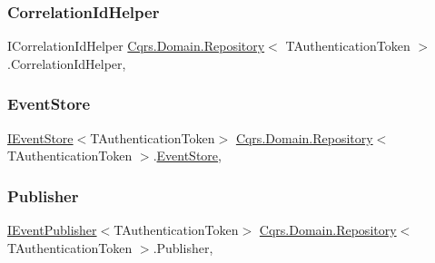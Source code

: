 \subsubsection{\texorpdfstring{Correlation\+Id\+Helper}{CorrelationIdHelper}}
{\footnotesize\ttfamily I\+Correlation\+Id\+Helper \hyperlink{classCqrs_1_1Domain_1_1Repository}{Cqrs.\+Domain.\+Repository}$<$ T\+Authentication\+Token $>$.Correlation\+Id\+Helper\hspace{0.3cm}{\ttfamily [get]}, {\ttfamily [protected]}}

\mbox{\label{classCqrs_1_1Domain_1_1Repository_a9adbd73546e04ef67c8fb032e9c6d1a8}} 
\subsubsection{\texorpdfstring{Event\+Store}{EventStore}}
{\footnotesize\ttfamily \hyperlink{interfaceCqrs_1_1Events_1_1IEventStore}{I\+Event\+Store}$<$T\+Authentication\+Token$>$ \hyperlink{classCqrs_1_1Domain_1_1Repository}{Cqrs.\+Domain.\+Repository}$<$ T\+Authentication\+Token $>$.\hyperlink{classCqrs_1_1Events_1_1EventStore}{Event\+Store}\hspace{0.3cm}{\ttfamily [get]}, {\ttfamily [protected]}}

\mbox{\label{classCqrs_1_1Domain_1_1Repository_a11b1d3a66404b212e93ca706e7c5eea4}} 
\subsubsection{\texorpdfstring{Publisher}{Publisher}}
{\footnotesize\ttfamily \hyperlink{interfaceCqrs_1_1Events_1_1IEventPublisher}{I\+Event\+Publisher}$<$T\+Authentication\+Token$>$ \hyperlink{classCqrs_1_1Domain_1_1Repository}{Cqrs.\+Domain.\+Repository}$<$ T\+Authentication\+Token $>$.Publisher\hspace{0.3cm}{\ttfamily [get]}, {\ttfamily [protected]}}

